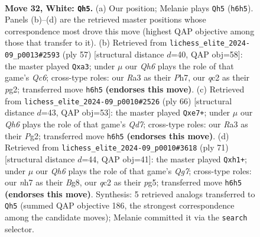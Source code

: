 \documentclass[11pt]{article}
\begin{document}
\clearpage

\begin{figure}[p]\centering
\begin{subfigure}{0.46\textwidth}\centering
\resizebox{\linewidth}{!}{%
\newchessgame
\chessboard[
  setfen={4r2k/p2p3n/2p2p1Q/8/1PPP4/R7/2q2P1P/6K1 w - - 0 32},
  showmover=false,
  pgfstyle=straightmove, color=movearrow, markmove={h6-h5}
]}
\caption{}
\end{subfigure}\hfill
\begin{subfigure}{0.46\textwidth}\centering
\resizebox{\linewidth}{!}{%
\newchessgame
\chessboard[
  setfen={6k1/2p3pp/3p4/1P6/p1P5/P1q5/3N2PP/1R2K3 b - - 0 29},
  showmover=false,
  pgfstyle=straightmove, color=movearrow, markmove={c3-a3}
]}
\caption{}
\end{subfigure}
\\[4pt]
\begin{subfigure}{0.46\textwidth}\centering
\resizebox{\linewidth}{!}{%
\newchessgame
\chessboard[
  setfen={8/2pQn1k1/p6p/7q/Pp1p4/8/1PP3PP/7K w - - 0 34},
  showmover=false,
  pgfstyle=straightmove, color=movearrow, markmove={d7-e7}
]}
\caption{}
\end{subfigure}\hfill
\begin{subfigure}{0.46\textwidth}\centering
\resizebox{\linewidth}{!}{%
\newchessgame
\chessboard[
  setfen={5kbQ/6p1/p2p4/5PPK/2P1p3/3r4/6q1/7R b - - 1 36},
  showmover=false,
  pgfstyle=straightmove, color=movearrow, markmove={g2-h1}
]}
\caption{}
\end{subfigure}
\caption{\textbf{Move 32, White: \texttt{Qh5}.} (a) Our position; Melanie plays \texttt{Qh5} (\texttt{h6h5}). Panels (b)--(d) are the retrieved master positions whose correspondence most drove this move (highest QAP objective among those that transfer to it). (b) Retrieved from \texttt{lichess\_elite\_2024-09\_p0013\#2593} (ply 57) [structural distance $d$=40, QAP obj=58]: the master played \texttt{Qxa3}; under $\mu$ our \emph{Qh6} plays the role of that game's \emph{Qc6}; cross-type roles: our \emph{R}a3 as their \emph{P}h7, our \emph{q}c2 as their \emph{p}g2; transferred move \texttt{h6h5} \textbf{(endorses this move)}. (c) Retrieved from \texttt{lichess\_elite\_2024-09\_p0010\#2526} (ply 66) [structural distance $d$=43, QAP obj=53]: the master played \texttt{Qxe7+}; under $\mu$ our \emph{Qh6} plays the role of that game's \emph{Qd7}; cross-type roles: our \emph{R}a3 as their \emph{P}g2; transferred move \texttt{h6h5} \textbf{(endorses this move)}. (d) Retrieved from \texttt{lichess\_elite\_2024-09\_p0010\#3618} (ply 71) [structural distance $d$=44, QAP obj=41]: the master played \texttt{Qxh1+}; under $\mu$ our \emph{Qh6} plays the role of that game's \emph{Qg7}; cross-type roles: our \emph{n}h7 as their \emph{B}g8, our \emph{q}c2 as their \emph{p}g5; transferred move \texttt{h6h5} \textbf{(endorses this move)}. Synthesis: 5 retrieved analogs transferred to \texttt{Qh5} (summed QAP objective 186, the strongest correspondence among the candidate moves); Melanie committed it via the \texttt{search} selector.}
\label{fig:thought-m62}
\end{figure}
\end{document}
